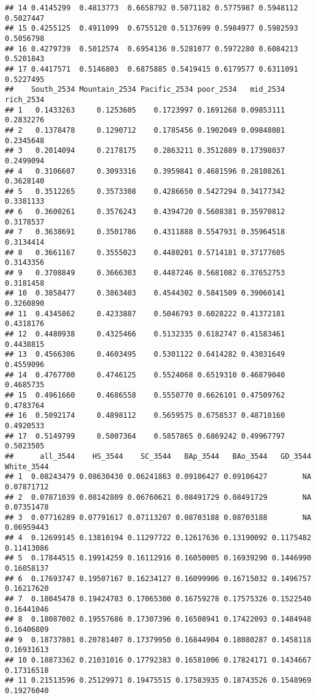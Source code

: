 \documentclass[
]{article}
\begin{document}
\begin{verbatim}
## 14 0.4145299  0.4813773  0.6658792 0.5071182 0.5775987 0.5948112    0.5027447
## 15 0.4255125  0.4911099  0.6755120 0.5137699 0.5984977 0.5982593    0.5056798
## 16 0.4279739  0.5012574  0.6954136 0.5281077 0.5972280 0.6084213    0.5201843
## 17 0.4417571  0.5146803  0.6875885 0.5419415 0.6179577 0.6311091    0.5227495
##    South_2534 Mountain_2534 Pacific_2534 poor_2534   mid_2534 rich_2534
## 1   0.1433263     0.1253605    0.1723997 0.1691268 0.09853111 0.2832276
## 2   0.1378478     0.1290712    0.1785456 0.1902049 0.09848081 0.2345648
## 3   0.2014094     0.2178175    0.2863211 0.3512889 0.17398037 0.2499094
## 4   0.3106607     0.3093316    0.3959841 0.4681596 0.28108261 0.3628140
## 5   0.3512265     0.3573308    0.4286650 0.5427294 0.34177342 0.3381133
## 6   0.3600261     0.3576243    0.4394720 0.5608381 0.35970812 0.3178537
## 7   0.3638691     0.3501786    0.4311888 0.5547931 0.35964518 0.3134414
## 8   0.3661167     0.3555023    0.4480201 0.5714181 0.37177605 0.3143356
## 9   0.3708849     0.3666303    0.4487246 0.5681082 0.37652753 0.3181458
## 10  0.3858477     0.3863403    0.4544302 0.5841509 0.39060141 0.3260890
## 11  0.4345862     0.4233887    0.5046793 0.6028222 0.41372181 0.4318176
## 12  0.4480938     0.4325466    0.5132335 0.6182747 0.41583461 0.4438815
## 13  0.4566306     0.4603495    0.5301122 0.6414282 0.43031649 0.4559096
## 14  0.4767700     0.4746125    0.5524068 0.6519310 0.46879040 0.4685735
## 15  0.4961660     0.4686558    0.5550770 0.6626101 0.47509762 0.4783764
## 16  0.5092174     0.4898112    0.5659575 0.6758537 0.48710160 0.4920533
## 17  0.5149799     0.5007364    0.5857865 0.6869242 0.49967797 0.5023505
##      all_3544    HS_3544    SC_3544   BAp_3544   BAo_3544   GD_3544 White_3544
## 1  0.08243479 0.08630430 0.06241863 0.09106427 0.09106427        NA 0.07871712
## 2  0.07871039 0.08142809 0.06760621 0.08491729 0.08491729        NA 0.07351478
## 3  0.07716289 0.07791617 0.07113207 0.08703188 0.08703188        NA 0.06959443
## 4  0.12699145 0.13810194 0.11297722 0.12617636 0.13190092 0.1175482 0.11413086
## 5  0.17844515 0.19914259 0.16112916 0.16050005 0.16939290 0.1446990 0.16058137
## 6  0.17693747 0.19507167 0.16234127 0.16099906 0.16715032 0.1496757 0.16217620
## 7  0.18045478 0.19424783 0.17065300 0.16759278 0.17575326 0.1522540 0.16441046
## 8  0.18087002 0.19557686 0.17307396 0.16508941 0.17422093 0.1484948 0.16406809
## 9  0.18737801 0.20781407 0.17379950 0.16844904 0.18080287 0.1458118 0.16931613
## 10 0.18873362 0.21031016 0.17792383 0.16581006 0.17824171 0.1434667 0.17316518
## 11 0.21513596 0.25129971 0.19475515 0.17583935 0.18743526 0.1548969 0.19276040

\end{verbatim}
\end{document}
